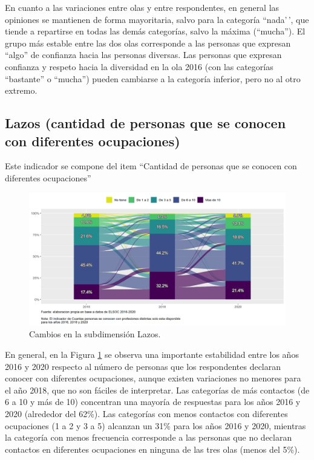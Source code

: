 \documentclass[
  12pt,
]{book}
\begin{document}
En cuanto a las variaciones entre olas y entre respondentes, en general las opiniones se mantienen de forma mayoritaria, salvo para la categoría ``nada'\,', que tiende a repartirse en todas las demás categorías, salvo la máxima (``mucha''). El grupo más estable entre las dos olas corresponde a las personas que expresan ``algo'' de confianza hacia las personas diversas. Las personas que expresan confianza y respeto hacia la diversidad en la ola 2016 (con las categorías ``bastante'' o ``mucha'') pueden cambiarse a la categoría inferior, pero no al otro extremo.

\hypertarget{lazos-cantidad-de-personas-que-se-conocen-con-diferentes-ocupaciones}{%
\subsection{Lazos (cantidad de personas que se conocen con diferentes ocupaciones)}\label{lazos-cantidad-de-personas-que-se-conocen-con-diferentes-ocupaciones}}

Este indicador se compone del item ``Cantidad de personas que se conocen con diferentes ocupaciones''

\begin{figure}[H]

{\centering \includegraphics[width=1\linewidth,height=1\textheight]{output/graphs/alluvial_lazos} 

}

\caption{Cambios en la subdimensión Lazos.}\label{fig:alluvial-lazos}
\end{figure}

En general, en la Figura \ref{fig:alluvial-lazos} se observa una importante estabilidad entre los años 2016 y 2020 respecto al número de personas que los respondentes declaran conocer con diferentes ocupaciones, aunque existen variaciones no menores para el año 2018, que no son fáciles de interpretar. Las categorías de más contactos (de 6 a 10 y más de 10) concentran una mayoría de respuestas para los años 2016 y 2020 (alrededor del 62\%). Las categorías con menos contactos con diferentes ocupaciones (1 a 2 y 3 a 5) alcanzan un 31\% para los años 2016 y 2020, mientras la categoría con menos frecuencia corresponde a las personas que no declaran contactos en diferentes ocupaciones en ninguna de las tres olas (menos del 5\%).
\end{document}
